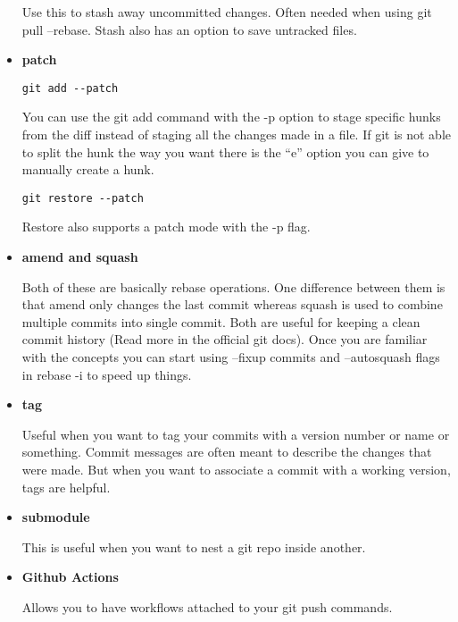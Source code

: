 \documentclass{../template/texnote}
\begin{document}
\begin{itemize}
Use this to stash away uncommitted changes. Often needed when using git pull --rebase. Stash also has an option to save untracked files.




	\item {\textbf{patch}}

\verb|git add --patch|

You can use the git add command with the -p option to stage specific hunks from the diff instead of staging all the changes made in a file. If git is not able to split the hunk the way you want there is the “e” option you can give to manually create a hunk.

\verb|git restore --patch|

Restore also supports a patch mode with the -p flag.

\item \textbf{amend and squash}

Both of these are basically rebase operations. One difference between them is that amend only changes the last commit whereas squash is used to combine multiple commits into single commit. Both are useful for keeping a clean commit history (Read more in the official git docs). Once you are familiar with the concepts you can start using --fixup commits and --autosquash flags in rebase -i to speed up things.

\item \textbf{tag}

Useful when you want to tag your commits with a version number or name or something. Commit messages are often meant to describe the changes that were made. But when you want to associate a commit with a working version, tags are helpful.

\item \textbf{submodule}

This is useful when you want to nest a git repo inside another.

\item \textbf{Github Actions}

Allows you to have workflows attached to your git push commands.
\end{itemize}
    \printbibliography
\end{document}
